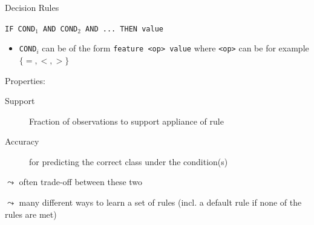 \documentclass[11pt,compress,t,notes=noshow, aspectratio=169, xcolor=table]{beamer}
\begin{document}
\begin{frame}{Decision Rules}

\texttt{IF COND$_1$ AND COND$_2$ AND ... THEN value}

\begin{itemize}
    \item \texttt{COND$_i$} can be of the form \texttt{feature <op> value} where \texttt{<op>} can be for example $\{=, <, > \}$
\end{itemize}


\medskip

Properties:
\begin{description}
    \item[Support] Fraction of observations to support appliance of rule
    \item[Accuracy] for predicting the correct class under the condition(s)
\end{description}

$\leadsto$ often trade-off between these two


\medskip

$\leadsto$ many different ways to learn a set of rules (incl. a default rule if none of the rules are met)

\end{frame}



\end{document}
